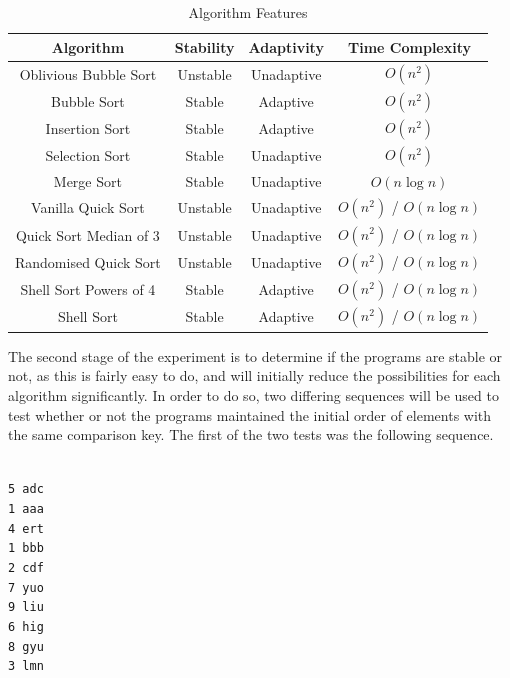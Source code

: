 \documentclass[a4paper]{article}
\newcommand{\ds}{\displaystyle}
\newcommand{\code}{\texttt}
\begin{document}
\begin{table}[ht]
\caption{Algorithm Features}
\begin{center}
	\begin{tabular}{|c|c|c|c|}
	\hline 
	\textbf{Algorithm} & \textbf{Stability} & \textbf{Adaptivity} & \textbf{Time Complexity} \\
	\hline
	Oblivious Bubble Sort & Unstable & Unadaptive & $\ds{O(n^2)}$ \\
	\hline
	Bubble Sort & Stable & Adaptive & $\ds{O(n^2)}$ \\
	\hline
	Insertion Sort & Stable & Adaptive & $\ds{O(n^2)}$ \\
	\hline
	Selection Sort & Stable & Unadaptive & $\ds{O(n^2)}$ \\
	\hline
	Merge Sort & Stable & Unadaptive & $\ds{O(n\log{n})}$ \\
	\hline
	Vanilla Quick Sort & Unstable & Unadaptive & $\ds{O(n^2)}$ / $\ds{O(n\log{n})}$ \\
	\hline
	Quick Sort Median of 3 & Unstable & Unadaptive & $\ds{O(n^2)}$ / $\ds{O(n\log{n})}$ \\
	\hline
	Randomised Quick Sort & Unstable & Unadaptive & $\ds{O(n^2)}$ / $\ds{O(n\log{n})}$ \\
	\hline
	Shell Sort Powers of 4 & Stable & Adaptive & $\ds{O(n^2)}$ / $\ds{O(n\log{n})}$ \\
	\hline
	Shell Sort & Stable & Adaptive & $\ds{O(n^2)}$ / $\ds{O(n\log{n})}$ \\
	\hline
	\end{tabular}

\end{center}

\end{table}

\pagebreak

The second stage of the experiment is to determine if the programs are stable or not, as this is fairly easy to do, and will initially reduce the possibilities for each algorithm significantly. In order to do so, two differing sequences will be used to test whether or not the programs maintained the initial order of elements with the same comparison key. The first of the two tests was the following sequence.
\begin{tabbing}
\hspace{10mm} \= \\ 
\> \code{5 adc}\\
\> \code{1 aaa}\\
\> \code{4 ert}\\
\> \code{1 bbb}\\
\> \code{2 cdf}\\
\> \code{7 yuo}\\
\> \code{9 liu}\\
\> \code{6 hig}\\
\> \code{8 gyu}\\
\> \code{3 lmn}\\
\end{tabbing}
\end{document}
